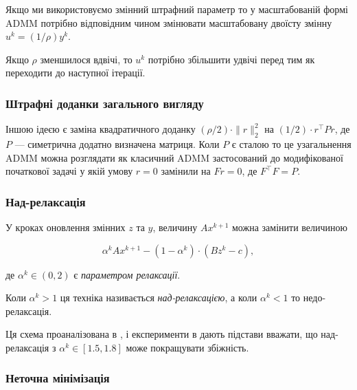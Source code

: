 \begin{remark}
    Якщо ми використовуємо змінний штрафний параметр то у масштабованій формі ADMM потрібно відповідним чином змінювати масштабовану двоїсту змінну $u^k = (1 / \rho) y^k$.
\end{remark}

\begin{example}
    Якщо $\rho$ зменшилося вдвічі, то $u^k$ потрібно збільшити удвічі перед тим як переходити до наступної ітерації.
\end{example}

\subsubsection{Штрафні доданки загального вигляду}

Іншою ідеєю є заміна квадратичного доданку $(\rho/2) \cdot \|r\|_2^2$ на $(1/2) \cdot r^\intercal P r$, де $P$ --- симетрична додатно визначена матриця. Коли $P$ є сталою то це узагальнення ADMM можна розглядати як класичний ADMM застосований до модифікованої початкової задачі у якій умову $r = 0$ замінили на $F r = 0$, де $F^\intercal F = P$.

\subsubsection{Над-релаксація}

У кроках оновлення змінних $z$ та $y$, величину $Ax^{k + 1}$ можна замінити величиною

\begin{equation}
	\alpha^k A x^{k + 1} - (1 - \alpha^k) \cdot (B z^k - c),
\end{equation}

де $\alpha^k \in (0, 2)$ є \textit{параметром релаксації}.

\begin{definition}
    Коли $\alpha^k > 1$ ця техніка називається \textit{над-релаксацією}, а коли $\alpha^k < 1$ то недо-релаксація.
\end{definition}

Ця схема проаналізована в \cite{63}, і експерименти в \cite{59, 64} дають підстави вважати, що над-релаксація з $\alpha^k \in [1.5, 1.8]$ може покращувати збіжність.

\subsubsection{Неточна мінімізація}

